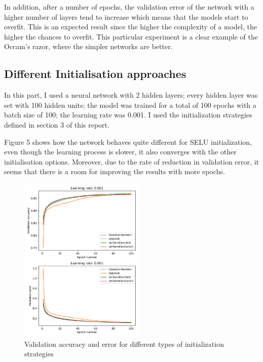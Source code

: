 \documentclass{article}
\begin{document}
In addition, after a number of epochs, the validation error of the network with a higher number of layers tend to increase which means that the models start to overfit. This is an expected result since the higher the complexity of a model, the higher the chances to overfit. This particular experiment is a clear example of the Occam's razor, where the simpler networks are better.

\subsection{ Different Initialisation approaches}

In this part, I used a neural network with 2 hidden layers; every hidden layer was set with 100 hidden units; the model was trained for a total of 100 epochs with a batch size of 100; the learning rate was 0.001. I used the initialization strategies defined in section 3 of this report. 

Figure 5 shows how the network behaves quite different for SELU initialization, even though the learning process is slower, it also converges with the other initialisation options. Moreover, due to the rate of reduction in validation error, it seems that there is a room for improving the results with more epochs.

\begin{figure}[tb]
\vskip 5mm
\begin{center}
\centerline{\includegraphics[width=60mm]{validation_acc_err_init}}
\caption{Validation accuracy and error for different types of initialization strategies}
\label{fig:validation_acc_err_init}
\end{center}
\vskip -5mm
\end{figure}
\end{document}
